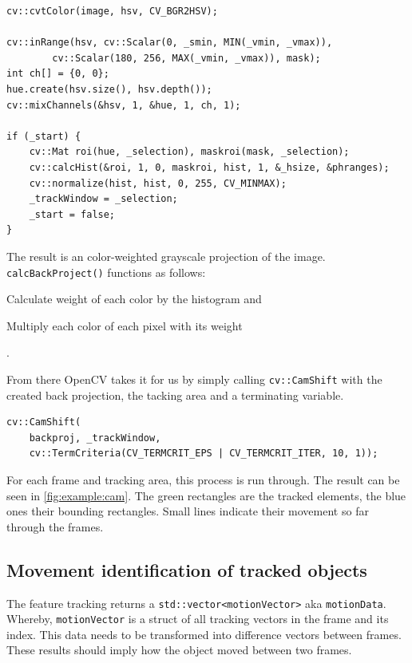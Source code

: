 \begin{lstlisting}[caption={Preparation for tracking},label=lst:prep]
cv::cvtColor(image, hsv, CV_BGR2HSV);

cv::inRange(hsv, cv::Scalar(0, _smin, MIN(_vmin, _vmax)),
        cv::Scalar(180, 256, MAX(_vmin, _vmax)), mask);
int ch[] = {0, 0};
hue.create(hsv.size(), hsv.depth());
cv::mixChannels(&hsv, 1, &hue, 1, ch, 1);

if (_start) {
    cv::Mat roi(hue, _selection), maskroi(mask, _selection);
    cv::calcHist(&roi, 1, 0, maskroi, hist, 1, &_hsize, &phranges);
    cv::normalize(hist, hist, 0, 255, CV_MINMAX);
    _trackWindow = _selection;
    _start = false;
}
\end{lstlisting}

The result is an color-weighted grayscale projection of the image. \texttt{calcBackProject()} functions as follows:
\begin{enumerate*}[label= (\roman*)]
    \item Calculate weight of each color by the histogram and
    \item Multiply each color of each pixel with its weight
\end{enumerate*}.

From there OpenCV takes it for us by simply calling \texttt{cv::CamShift} with the created back projection, the tacking area and a terminating variable.
\begin{lstlisting}[caption={CAMshift call},label=lst:cam]
cv::CamShift(
    backproj, _trackWindow,
    cv::TermCriteria(CV_TERMCRIT_EPS | CV_TERMCRIT_ITER, 10, 1));
\end{lstlisting}

For each frame and tracking area, this process is run through. The result can be seen in \cref{fig:example:cam}. The green rectangles are the tracked elements, the blue ones their bounding rectangles. Small lines indicate their movement so far through the frames.

\subsection{Movement identification of tracked objects}
The feature tracking returns a \texttt{std::vector<motionVector>} aka \texttt{motionData}. Whereby, \texttt{motionVector} is a struct of all tracking vectors in the frame and its index. This data needs to be transformed into difference vectors between frames. These results should imply how the object moved between two frames.


